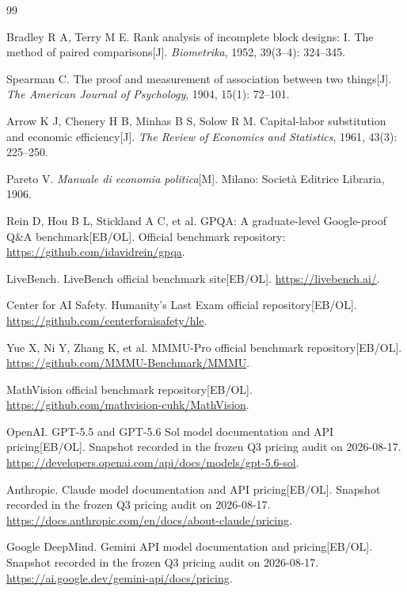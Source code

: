 \begin{thebibliography}{99}

Bradley R A, Terry M E. Rank analysis of incomplete block designs: I. The method of paired comparisons[J]. \textit{Biometrika}, 1952, 39(3--4): 324--345.

Spearman C. The proof and measurement of association between two things[J]. \textit{The American Journal of Psychology}, 1904, 15(1): 72--101.

Arrow K J, Chenery H B, Minhas B S, Solow R M. Capital-labor substitution and economic efficiency[J]. \textit{The Review of Economics and Statistics}, 1961, 43(3): 225--250.

Pareto V. \textit{Manuale di economia politica}[M]. Milano: Società Editrice Libraria, 1906.

Rein D, Hou B L, Stickland A C, et al. GPQA: A graduate-level Google-proof Q\&A benchmark[EB/OL]. Official benchmark repository: \url{https://github.com/idavidrein/gpqa}.

LiveBench. LiveBench official benchmark site[EB/OL]. \url{https://livebench.ai/}.

Center for AI Safety. Humanity's Last Exam official repository[EB/OL]. \url{https://github.com/centerforaisafety/hle}.

Yue X, Ni Y, Zhang K, et al. MMMU-Pro official benchmark repository[EB/OL]. \url{https://github.com/MMMU-Benchmark/MMMU}.

MathVision official benchmark repository[EB/OL]. \url{https://github.com/mathvision-cuhk/MathVision}.

OpenAI. GPT-5.5 and GPT-5.6 Sol model documentation and API pricing[EB/OL]. Snapshot recorded in the frozen Q3 pricing audit on 2026-08-17. \url{https://developers.openai.com/api/docs/models/gpt-5.6-sol}.

Anthropic. Claude model documentation and API pricing[EB/OL]. Snapshot recorded in the frozen Q3 pricing audit on 2026-08-17. \url{https://docs.anthropic.com/en/docs/about-claude/pricing}.

Google DeepMind. Gemini API model documentation and pricing[EB/OL]. Snapshot recorded in the frozen Q3 pricing audit on 2026-08-17. \url{https://ai.google.dev/gemini-api/docs/pricing}.


\end{thebibliography}

